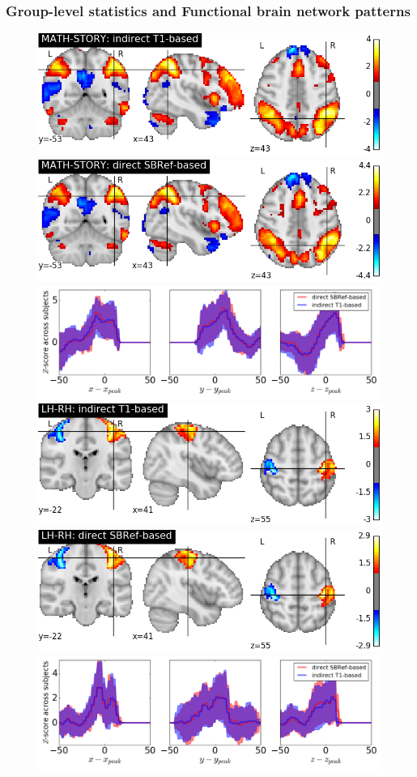 \subsubsection{Group-level statistics and Functional brain network patterns}
\begin{figure}[!htbp]
\includegraphics[width=.48\linewidth]{figures/MATH-STORY_DC+T1.png}
\includegraphics[width=.48\linewidth]{figures/MATH-STORY_DC+SBRef.png}
\includegraphics[width=1\linewidth]{figures/MATH-STORY_blobs.png}
\includegraphics[width=.48\linewidth]{figures/LH-RH_DC+T1.png}
\includegraphics[width=.48\linewidth]{figures/LH-RH_DC+SBRef.png}
\includegraphics[width=1\linewidth]{figures/LH-RH_blobs.png}


\end{figure}
